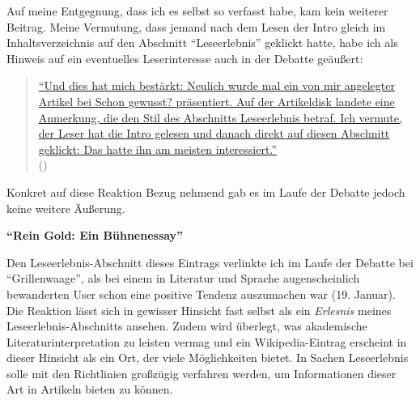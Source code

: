 \documentclass[fontsize=12pt]{scrartcl}
\begin{document}
Auf meine Entgegnung, dass ich es \mbox{selbst} so verfasst habe, kam kein weiterer Beitrag. Meine Vermutung, dass jemand nach dem Lesen der Intro gleich im Inhaltsver\-zeich\-nis auf den Abschnitt "`Leseerlebnis"' geklickt hatte, habe ich als Hinweis auf ein eventuelles Leser\textsuperscript{\tiny *}interesse auch in der Debatte ge\"au{\ss}ert: 

\singlespacing
\begin{quote}
\href{https://de.wikipedia.org/w/index.php?title=Benutzer_Diskussion:Grillenwaage\&diff=next\&oldid=138021151}{"`Und dies hat mich best\"arkt: Neulich wurde mal ein von mir angelegter Artikel bei \flq Schon gewusst?\frq \,\,pr\"asentiert. Auf der Artikeldisk landete eine Anmerkung, die den Stil des Abschnitts Leseerlebnis betraf. Ich vermute, der Leser hat die Intro gelesen und danach direkt auf diesen Abschnitt geklickt: Das hatte ihn am meisten interessiert."'}\\ (\cite{UserC.Koltzenburg2015})
\end{quote}
\onehalfspacing

Konkret auf diese Reaktion Bezug nehmend gab es im Laufe der Debatte jedoch keine weitere \"Au{\ss}erung.\newline

\textbf{"`Rein Gold: Ein B\"uhnenessay"'}

Den Leseerlebnis-Abschnitt dieses Eintrags verlinkte ich im Laufe der Debatte bei "`Grillenwaage"', als bei einem in Li\-te\-ra\-tur und Sprache augenscheinlich bewanderten \mbox{User} schon eine positive Tendenz auszumachen war (19. Januar). Die Reaktion l\"asst sich in gewisser Hinsicht fast \mbox{selbst} als ein \textit{Erlesnis} meines Leseerlebnis-Abschnitts ansehen. Zudem wird \"uberlegt, was akademische Li\-te\-ra\-tur\-interpretation zu leisten vermag und ein Wi\-ki\-pe\-dia-Eintrag erscheint in dieser Hinsicht als ein Ort, der viele M\"oglichkei\-ten bietet. In Sachen Leseerlebnis solle mit den Richtlinien gro{\ss}z\"ugig verfahren werden, um Informationen dieser Art in Artikeln bieten zu k\"onnen.
\end{document}
